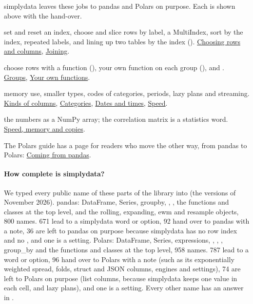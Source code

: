
simplydata leaves these jobs to pandas and Polars on purpose. Each is shown above with the hand-over.
\begin{description}[style=nextline,leftmargin=1.2em]
  \item[The row index] set and reset an index, choose and slice rows by label, a MultiIndex, sort by the
    index, repeated labels, and lining up two tables by the index ().
    \hyperref[from-pandas:choosing]{Choosing rows and columns}, \hyperref[from-pandas:joining]{Joining}.
  \item[Functions in a chain] choose rows with a function (), your own function on
    each group (), and . \hyperref[from-pandas:groups]{Groups},
    \hyperref[from-pandas:functions]{Your own functions}.
  \item[Storage] memory use, smaller types, codes of categories, periods, lazy plans and streaming.
    \hyperref[from-pandas:kinds]{Kinds of columns}, \hyperref[from-pandas:categories]{Categories},
    \hyperref[from-pandas:dates]{Dates and times}, \hyperref[from-pandas:speed]{Speed}.
  \item[Other packages] the numbers as a NumPy array; the correlation matrix is a statistics word.
    \hyperref[from-pandas:speed]{Speed, memory and copies}.
\end{description}
The Polars guide has a page for readers who move the other way, from pandas to Polars:
\href{https://docs.pola.rs/user-guide/migration/pandas/}{Coming from pandas}.

\paragraph{How complete is simplydata?}
We typed every public name of these parts of the library into  (the versions of November 2026).
pandas: DataFrame, Series, groupby, , , the functions and classes at the top level, and the
rolling, expanding, ewm and resample objects, 800 names. 671 lead to a simplydata word or option, 92 hand over to
pandas with a note, 36 are left to pandas on purpose because simplydata has no row index and no , and
one is a setting. Polars: DataFrame, Series, expressions, , , , group\_by and the
functions and classes at the top level, 958 names. 787 lead to a word or option, 96 hand over to Polars with a
note (such as its exponentially weighted spread, folds, struct and JSON columns, engines and settings), 74 are
left to Polars on purpose (list columns, because simplydata keeps one value in each cell, and lazy plans), and
one is a setting. Every other name has an answer in .

